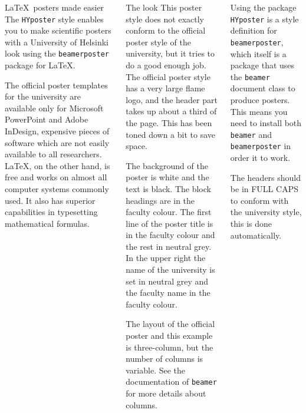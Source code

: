 \documentclass[final]{beamer}
\author[Wilkman]{Olli Wilkman}
\date{\today}
\begin{document}
\begin{frame}[t, fragile]
\begin{columns}[T]
\column{0.05\paperwidth}
	
\column{0.3\paperwidth}


\begin{block}{\LaTeX~posters made easier}
The \texttt{HYposter} style enables you to make scientific posters with a University of Helsinki look using  the \texttt{beamerposter} package for \LaTeX. 

The official poster templates for the university are available only for Microsoft PowerPoint and Adobe InDesign, expensive pieces of software which are not easily available to all researchers. \LaTeX, on the other hand, is free and works on almost all computer systems commonly used. It also has superior capabilities in typesetting mathematical formulas.
\end{block}


\begin{block}{The look}
This poster style does not exactly conform to the official poster style of the university, but it tries to do a good enough job. The official poster style has a very large flame logo, and the header part takes up about a third of the page. This has been toned down a bit to save space.

The background of the poster is white and the text is black. The block headings are in the faculty colour. The first line of the poster title is in the faculty colour and the rest in neutral grey. In the upper right the name of the university is set in neutral grey and the faculty name in the faculty colour.

The layout of the official poster and this example is three-column, but the number of columns is variable. See the documentation of \texttt{beamer} for more details about columns.
\end{block}


\begin{block}{Using the package}
\texttt{HYposter} is a style definition for \texttt{beamerposter}, which itself is a package that uses the \texttt{beamer} document class to produce posters. This means you need to install both \texttt{beamer} and \texttt{beamerposter} in order it to work.

The headers should be in FULL CAPS to conform with the university style, this is done automatically.
\end{block}


\column{0.3\paperwidth}


\end{columns}
\end{frame}
\end{document}
